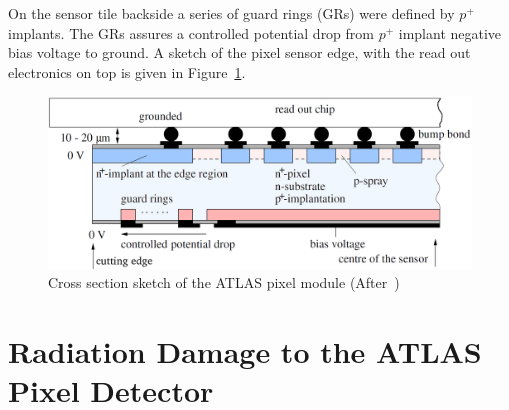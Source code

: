 On the sensor tile backside a series of guard rings (GRs) were defined by $p^+$ implants. The GRs 
assures a controlled potential drop from  $p^+$ implant negative bias voltage to ground. 
A sketch of the pixel sensor edge, with the read out electronics on top is given in 
Figure~\ref{fig:sensorbb}.
\begin{figure}[!htbp]
\centering
\includegraphics[width=1.00\textwidth]{sensorbb.png}
\caption{\label{fig:sensorbb} Cross section sketch of the ATLAS pixel module (After~\cite{Altenheiner:2012zz})}
\end{figure}

\section{Radiation Damage to the ATLAS Pixel Detector}
\label{sec:digitizer}

